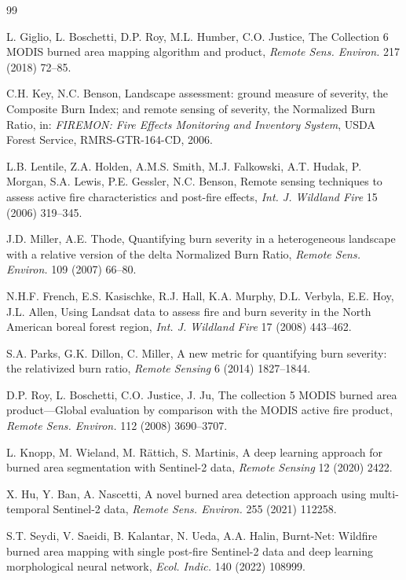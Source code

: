 \documentclass[review,12pt]{elsarticle}
\begin{document}
\begin{thebibliography}{99}

L. Giglio, L. Boschetti, D.P. Roy, M.L. Humber, C.O. Justice,
The Collection 6 MODIS burned area mapping algorithm and product,
\textit{Remote Sens. Environ.} 217 (2018) 72--85.

C.H. Key, N.C. Benson,
Landscape assessment: ground measure of severity, the Composite Burn Index; and remote sensing of severity, the Normalized Burn Ratio,
in: \textit{FIREMON: Fire Effects Monitoring and Inventory System}, USDA Forest Service, RMRS-GTR-164-CD, 2006.

L.B. Lentile, Z.A. Holden, A.M.S. Smith, M.J. Falkowski, A.T. Hudak, P. Morgan, S.A. Lewis, P.E. Gessler, N.C. Benson,
Remote sensing techniques to assess active fire characteristics and post-fire effects,
\textit{Int. J. Wildland Fire} 15 (2006) 319--345.

J.D. Miller, A.E. Thode,
Quantifying burn severity in a heterogeneous landscape with a relative version of the delta Normalized Burn Ratio,
\textit{Remote Sens. Environ.} 109 (2007) 66--80.

N.H.F. French, E.S. Kasischke, R.J. Hall, K.A. Murphy, D.L. Verbyla, E.E. Hoy, J.L. Allen,
Using Landsat data to assess fire and burn severity in the North American boreal forest region,
\textit{Int. J. Wildland Fire} 17 (2008) 443--462.

S.A. Parks, G.K. Dillon, C. Miller,
A new metric for quantifying burn severity: the relativized burn ratio,
\textit{Remote Sensing} 6 (2014) 1827--1844.

D.P. Roy, L. Boschetti, C.O. Justice, J. Ju,
The collection 5 MODIS burned area product---Global evaluation by comparison with the MODIS active fire product,
\textit{Remote Sens. Environ.} 112 (2008) 3690--3707.

L. Knopp, M. Wieland, M. Rättich, S. Martinis,
A deep learning approach for burned area segmentation with Sentinel-2 data,
\textit{Remote Sensing} 12 (2020) 2422.

X. Hu, Y. Ban, A. Nascetti,
A novel burned area detection approach using multi-temporal Sentinel-2 data,
\textit{Remote Sens. Environ.} 255 (2021) 112258.

S.T. Seydi, V. Saeidi, B. Kalantar, N. Ueda, A.A. Halin,
Burnt-Net: Wildfire burned area mapping with single post-fire Sentinel-2 data and deep learning morphological neural network,
\textit{Ecol. Indic.} 140 (2022) 108999.


\end{thebibliography}
\end{document}
